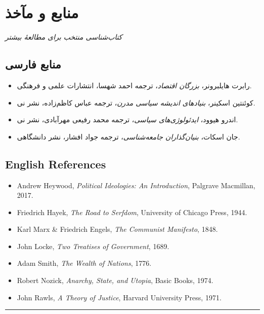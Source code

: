 \chapter*{منابع و مآخذ}

\begin{flushright}
\textit{کتاب‌شناسی منتخب برای مطالعهٔ بیشتر}
\end{flushright}

\vspace{10pt}

\section*{منابع فارسی}

\begin{itemize}[label=--]
    \item رابرت هایلبرونر، \textit{بزرگان اقتصاد}، ترجمه احمد شهسا، انتشارات علمی و فرهنگی.
    \item کوئنتین اسکینر، \textit{بنیادهای اندیشه سیاسی مدرن}، ترجمه عباس کاظم‌زاده، نشر نی.
    \item اندرو هیوود، \textit{ایدئولوژی‌های سیاسی}، ترجمه محمد رفیعی مهرآبادی، نشر نی.
    \item جان اسکات، \textit{بنیان‌گذاران جامعه‌شناسی}، ترجمه جواد افشار، نشر دانشگاهی.
\end{itemize}

\vspace{15pt}

\section*{English References}

\begin{latin}
\begin{itemize}[label=--]
    \item Andrew Heywood, \textit{Political Ideologies: An Introduction}, Palgrave Macmillan, 2017.
    \item Friedrich Hayek, \textit{The Road to Serfdom}, University of Chicago Press, 1944.
    \item Karl Marx \& Friedrich Engels, \textit{The Communist Manifesto}, 1848.
    \item John Locke, \textit{Two Treatises of Government}, 1689.
    \item Adam Smith, \textit{The Wealth of Nations}, 1776.
    \item Robert Nozick, \textit{Anarchy, State, and Utopia}, Basic Books, 1974.
    \item John Rawls, \textit{A Theory of Justice}, Harvard University Press, 1971.
\end{itemize}
\end{latin}

\vspace{20pt}

\begin{center}
\rule{0.4\textwidth}{0.5pt}
\end{center}
